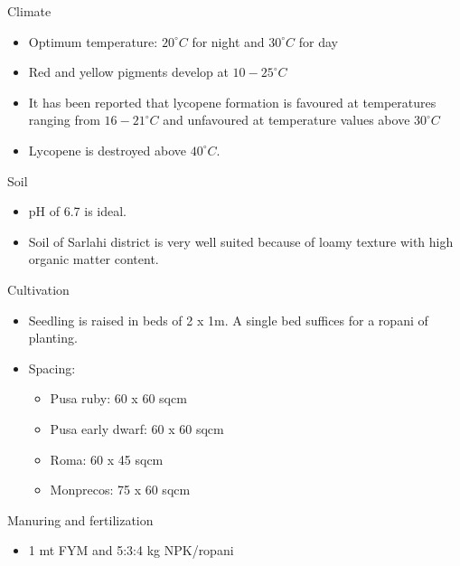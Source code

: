 \documentclass[
  ignorenonframetext,
  aspectratio=169]{beamer}
\providecommand{\tightlist}{%
  \setlength{\itemsep}{0pt}\setlength{\parskip}{0pt}}
\begin{document}
\begin{frame}{Climate}
\protect\hypertarget{climate}{}
\begin{itemize}
\tightlist
\item
  Optimum temperature: \(20^\circ C\) for night and \(30^\circ C\) for
  day
\item
  Red and yellow pigments develop at \(10-25^\circ C\)
\item
  It has been reported that lycopene formation is favoured at
  temperatures ranging from \(16-21^\circ C\) and unfavoured at
  temperature values above \(30^\circ C\)
\item
  Lycopene is destroyed above \(40^\circ C\).
\end{itemize}
\end{frame}

\begin{frame}{Soil}
\protect\hypertarget{soil}{}
\begin{itemize}
\tightlist
\item
  pH of 6.7 is ideal.
\item
  Soil of Sarlahi district is very well suited because of loamy texture
  with high organic matter content.
\end{itemize}
\end{frame}

\begin{frame}{Cultivation}
\protect\hypertarget{cultivation}{}
\begin{itemize}
\tightlist
\item
  Seedling is raised in beds of 2 x 1m. A single bed suffices for a
  ropani of planting.
\item
  Spacing:

  \begin{itemize}
  \tightlist
  \item
    Pusa ruby: 60 x 60 sqcm
  \item
    Pusa early dwarf: 60 x 60 sqcm
  \item
    Roma: 60 x 45 sqcm
  \item
    Monprecos: 75 x 60 sqcm
  \end{itemize}
\end{itemize}
\end{frame}

\begin{frame}{Manuring and fertilization}
\protect\hypertarget{manuring-and-fertilization}{}
\begin{itemize}
\tightlist
\item
  1 mt FYM and 5:3:4 kg NPK/ropani
\end{itemize}
\end{frame}
\end{document}

